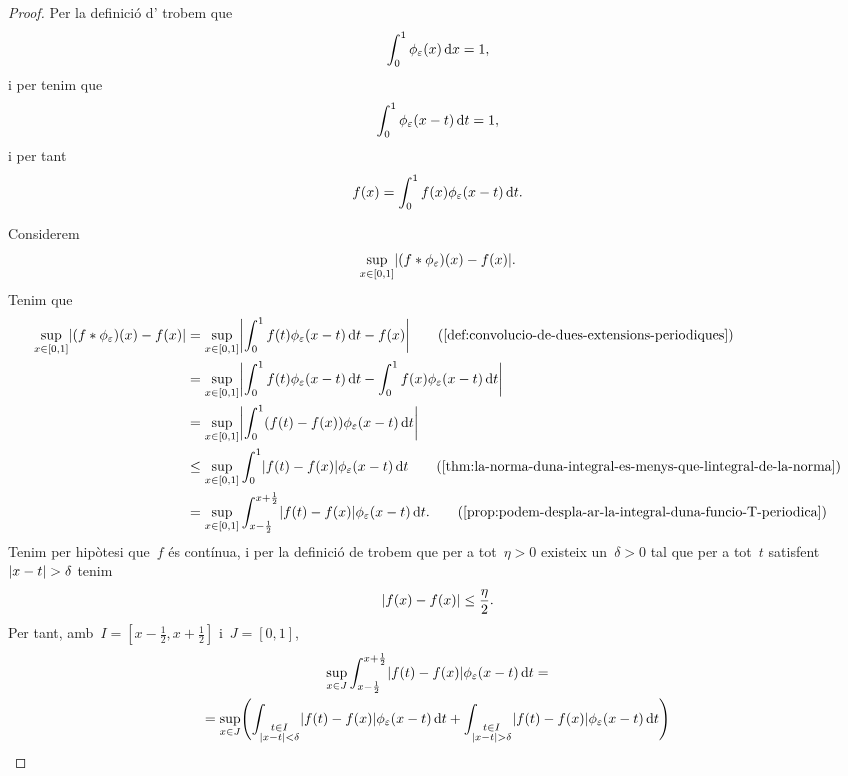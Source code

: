 \documentclass[../../main.tex]{subfiles}
\begin{document}
    \begin{proof}
        Per la definició d' trobem que
        \[
            \int_{0}^{1}\phi_{\varepsilon}(x)\mathop{}\!\mathrm{d} x=1,
        \]
        i per  tenim que
        \[
            \int_{0}^{1}\phi_{\varepsilon}(x-t)\mathop{}\!\mathrm{d} t=1,
        \]
        i per tant
        \[
            f(x)=\int_{0}^{1}f(x)\phi_{\varepsilon}(x-t)\mathop{}\!\mathrm{d} t.
        \]

        Considerem
        \[
            \sup_{x\in[0,1]}\abs{(f\convolucio\phi_{\varepsilon})(x)-f(x)}.
        \]
        Tenim que
        \begin{align*}
            \sup_{x\in[0,1]}\abs{(f\convolucio\phi_{\varepsilon})(x)-f(x)}&=\sup_{x\in[0,1]}\abs{\int_{0}^{1}f(t)\phi_{\varepsilon}(x-t)\diff t-f(x)} \tag{\ref{def:convolucio-de-dues-extensions-periodiques}} \\
            &=\sup_{x\in[0,1]}\abs{\int_{0}^{1}f(t)\phi_{\varepsilon}(x-t)\diff t-\int_{0}^{1}f(x)\phi_{\varepsilon}(x-t)\diff t} \\
            &=\sup_{x\in[0,1]}\abs{\int_{0}^{1}(f(t)-f(x))\phi_{\varepsilon}(x-t)\diff t} \\
            &\leq\sup_{x\in[0,1]}\int_{0}^{1}\abs{f(t)-f(x)}\phi_{\varepsilon}(x-t)\diff t \tag{\ref{thm:la-norma-duna-integral-es-menys-que-lintegral-de-la-norma}} \\
            &=\sup_{x\in[0,1]}\int_{x-\frac{1}{2}}^{x+\frac{1}{2}}\abs{f(t)-f(x)}\phi_{\varepsilon}(x-t)\diff t.
            \tag{\ref{prop:podem-despla-ar-la-integral-duna-funcio-T-periodica}}
        \end{align*}
         Tenim per hipòtesi que~\(f\) és contínua, i per la definició de  trobem que per a tot~\(\eta>0\) existeix un~\(\delta>0\) tal que per a tot~\(t\) satisfent~\(\abs{x-t}>\delta\) tenim
         \[
             \abs{f(x)-f(x)}\leq\frac{\eta}{2}.
         \]
         Per tant, amb~\(I=[x-\frac{1}{2},x+\frac{1}{2}]\) i~\(J=[0,1]\), %
         \begin{multline*}
             \sup_{x\in J}\int_{x-\frac{1}{2}}^{x+\frac{1}{2}}\abs{f(t)-f(x)}\phi_{\varepsilon}(x-t)\diff t = \\
             =\sup_{x\in J}\left(\int_{\substack{t\in I\\\abs{x-t}<\delta}}\abs{f(t)-f(x)}\phi_{\varepsilon}(x-t)\diff t+\int_{\substack{t\in I\\\abs{x-t}>\delta}}\abs{f(t)-f(x)}\phi_{\varepsilon}(x-t)\diff t\right) \hfill\\

\end{multline*}
\end{proof}
\end{document}
